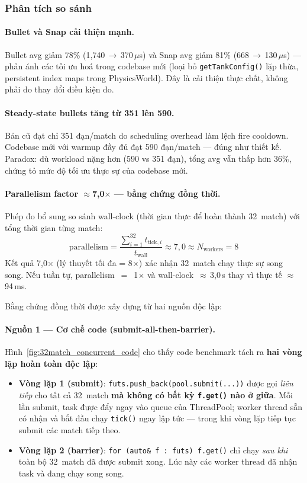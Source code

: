 \documentclass[12pt,a4paper]{report}
\begin{document}
\subsubsection*{Phân tích so sánh}

\paragraph{Bullet và Snap cải thiện mạnh.}
Bullet avg giảm 78\% (1{,}740\,$\to$\,370\,$\mu$s) và Snap avg giảm 81\%
(668\,$\to$\,130\,$\mu$s) --- phản ánh các tối ưu hoá trong codebase mới
(loại bỏ \texttt{getTankConfig()} lặp thừa, persistent index maps trong
PhysicsWorld). Đây là cải thiện thực chất, không phải do thay đổi điều kiện đo.

\paragraph{Steady-state bullets tăng từ 351 lên 590.}
Bản cũ đạt chỉ 351 đạn/match do scheduling overhead làm lệch fire cooldown.
Codebase mới với warmup đầy đủ đạt 590 đạn/match --- đúng như thiết kế.
Paradox: dù workload nặng hơn (590 vs 351 đạn), tổng avg vẫn thấp hơn 36\%,
chứng tỏ mức độ tối ưu thực sự của codebase mới.

\paragraph{Parallelism factor $\approx$7{,}0$\times$ --- bằng chứng đồng thời.}
Phép đo bổ sung so sánh wall-clock (thời gian thực để hoàn thành 32~match)
với tổng thời gian từng match:
\[
  \text{parallelism} = \frac{\sum_{i=1}^{32} t_{\text{tick},i}}{t_{\text{wall}}}
  \approx 7{,}0 \approx N_{\text{workers}} = 8
\]
Kết quả 7{,}0$\times$ (lý thuyết tối đa = 8$\times$) xác nhận 32~match
chạy thực sự song song. Nếu tuần tự, parallelism~$=$~1$\times$ và
wall-clock~$\approx$\,3{,}0\,s thay vì thực tế $\approx$\,94\,ms.

\noindent Bằng chứng đồng thời được xây dựng từ hai nguồn độc lập:

\paragraph*{Nguồn 1 --- Cơ chế code (submit-all-then-barrier).}
Hình~\ref{fig:32match_concurrent_code} cho thấy code benchmark tách ra
\textbf{hai vòng lặp hoàn toàn độc lập}:

\begin{itemize}
  \item \textbf{Vòng lặp 1 (submit)}: \texttt{futs.push\_back(pool.submit(...))}
        được gọi \emph{liên tiếp} cho tất cả 32~match \textbf{mà không có bất kỳ
        \texttt{f.get()} nào ở giữa}. Mỗi lần submit, task được đẩy ngay vào
        queue của ThreadPool; worker thread sẵn có nhận và bắt đầu chạy
        \texttt{tick()} ngay lập tức --- trong khi vòng lặp tiếp tục submit
        các match tiếp theo.
  \item \textbf{Vòng lặp 2 (barrier)}: \texttt{for (auto\& f : futs) f.get()}
        chỉ chạy \emph{sau khi} toàn bộ 32~match đã được submit xong.
        Lúc này các worker thread đã nhận task và đang chạy song song.
\end{itemize}
\end{document}

